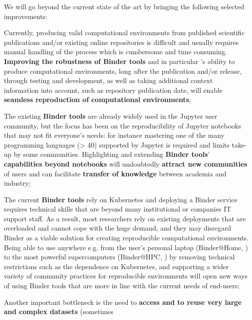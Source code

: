 We will go beyond the current state of the art by bringing the following selected improvements:
\begin{compactitem}
\item Currently, producing valid computational environments from published scientific publications and/or existing
      online repositories is difficult and usually requires manual handling of the process which is cumbersome and
      time consuming. \textbf{Improving the robustness of Binder tools} and in particular \repotodocker{}'s ability to
      produce computational environments, long after the publication and/or release,
      through testing and development, as well as taking additional context information into account,
      such as repository publication date, will enable \textbf{seamless reproduction of computational environments};
\item The existing \textbf{Binder tools} are already widely used in the Jupyter user community,
      but the focus has been on the reproducibility of Jupyter notebooks that may not fit everyone’s needs:
      for instance mastering one of the many programming languages (> 40) supported by Jupyter is required and limits take-up by some communities.
      Highlighting and extending \textbf{Binder tools}' \textbf{capabilities beyond notebooks}
      will undoubtedly \textbf{attract new communities} of users and can facilitate
      \textbf{transfer of knowledge} between academia and industry;
\item The current \textbf{Binder tools} rely on Kubernetes and deploying a Binder service requires technical skills that are
      beyond many institutional or companies IT support staff. As a result, most researchers rely on existing
      deployments that are overloaded and cannot cope with the huge demand, and they may disregard Binder
      as a viable solution for creating reproducible computational environments. Being able to use \repotodocker{}
      anywhere e.g. from the user’s personal laptop (Binder@Home, ) to the
      most powerful supercomputers (Binder@HPC, )
      by removing technical restrictions such as the dependence on Kubernetes,
      and supporting a wider variety of community practices for reproducible environments
      will open new ways of using Binder tools that are more in line with the current needs of end-users;
\item Another important bottleneck is the need to \textbf{access and to reuse very large and complex datasets} (sometimes

\end{compactitem}

